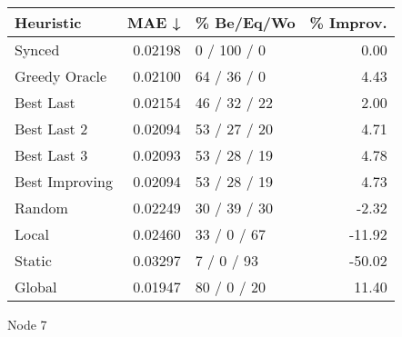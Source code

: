 \begin{tabular}{lrlr}
\toprule
\textbf{Heuristic} & \textbf{MAE ↓} & \textbf{\% Be/Eq/Wo} & \textbf{\% Improv.} \\
\midrule
            Synced &        0.02198 &          0 / 100 / 0 &                0.00 \\
     Greedy Oracle &        0.02100 &          64 / 36 / 0 &                4.43 \\
         Best Last &        0.02154 &         46 / 32 / 22 &                2.00 \\
       Best Last 2 &        0.02094 &         53 / 27 / 20 &                4.71 \\
       Best Last 3 &        0.02093 &         53 / 28 / 19 &                4.78 \\
    Best Improving &        0.02094 &         53 / 28 / 19 &                4.73 \\
            Random &        0.02249 &         30 / 39 / 30 &               -2.32 \\
             Local &        0.02460 &          33 / 0 / 67 &              -11.92 \\
            Static &        0.03297 &           7 / 0 / 93 &              -50.02 \\
            Global &        0.01947 &          80 / 0 / 20 &               11.40 \\
\bottomrule
\end{tabular}
\caption{Node 7}
\label{tab:non_lr05_le2_bs4_7}

